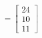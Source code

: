 \documentclass[preview]{standalone}
\begin{document}
\begin{align*}
=\begin{bmatrix} 24 \\ 10 \\ 11 \end{bmatrix}
\end{align*}
\end{document}
